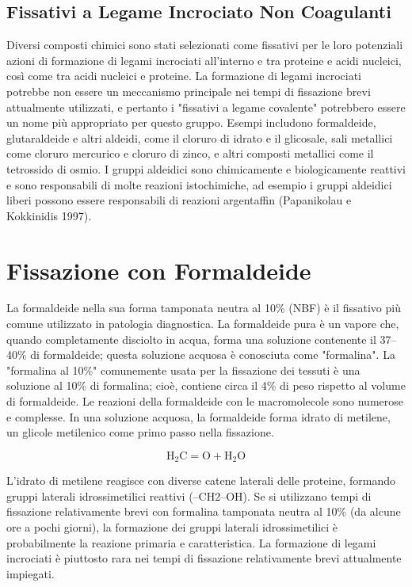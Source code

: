 \subsection{Fissativi a Legame Incrociato Non Coagulanti}
Diversi composti chimici sono stati selezionati come fissativi per le loro potenziali azioni di formazione di legami incrociati all'interno e tra proteine e acidi nucleici, così come tra acidi nucleici e proteine. La formazione di legami incrociati potrebbe non essere un meccanismo principale nei tempi di fissazione brevi attualmente utilizzati, e pertanto i "fissativi a legame covalente" potrebbero essere un nome più appropriato per questo gruppo. Esempi includono formaldeide, glutaraldeide e altri aldeidi, come il cloruro di idrato e il glicosale, sali metallici come cloruro mercurico e cloruro di zinco, e altri composti metallici come il tetrossido di osmio. I gruppi aldeidici sono chimicamente e biologicamente reattivi e sono responsabili di molte reazioni istochimiche, ad esempio i gruppi aldeidici liberi possono essere responsabili di reazioni argentaffin (Papanikolau e Kokkinidis 1997).

\section{Fissazione con Formaldeide}
La formaldeide nella sua forma tamponata neutra al 10\% (NBF) è il fissativo più comune utilizzato in patologia diagnostica. La formaldeide pura è un vapore che, quando completamente disciolto in acqua, forma una soluzione contenente il 37–40\% di formaldeide; questa soluzione acquosa è conosciuta come "formalina". La "formalina al 10\%" comunemente usata per la fissazione dei tessuti è una soluzione al 10\% di formalina; cioè, contiene circa il 4\% di peso rispetto al volume di formaldeide. Le reazioni della formaldeide con le macromolecole sono numerose e complesse.  In una soluzione acquosa, la formaldeide forma idrato di metilene, un glicole metilenico come primo passo nella fissazione.

\[
\text{H}_2\text{C} = \text{O} + \text{H}_2\text{O}
\]

L'idrato di metilene reagisce con diverse catene laterali delle proteine, formando gruppi laterali idrossimetilici reattivi (–CH2–OH). Se si utilizzano tempi di fissazione relativamente brevi con formalina tamponata neutra al 10\% (da alcune ore a pochi giorni), la formazione dei gruppi laterali idrossimetilici è probabilmente la reazione primaria e caratteristica. La formazione di legami incrociati è piuttosto rara nei tempi di fissazione relativamente brevi attualmente impiegati.

